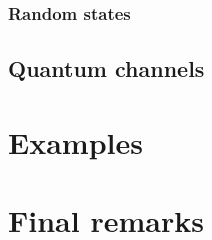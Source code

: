 \documentclass[11pt,a4paper]{article}
\begin{document}
\subsubsection{Random states}

\subsection{Quantum channels}

\section{Examples}

\section{Final remarks}
\end{document}
